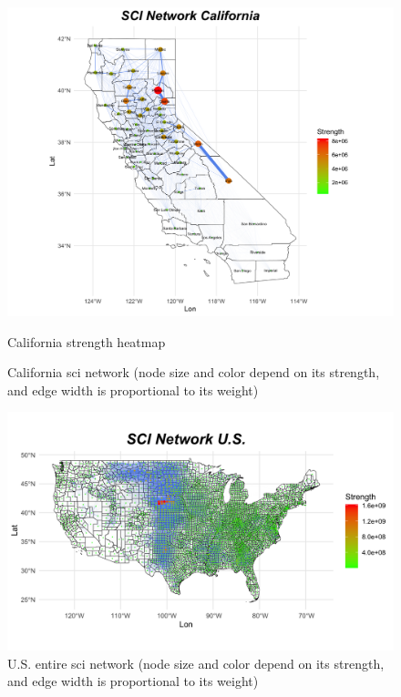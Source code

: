 \begin{figure}[h]
    \centering
    \begin{minipage}[c]{0.6\textwidth}
        \includegraphics[width= \textwidth]{images/task1/California/network_California_strength.png} 
        \caption{California strength heatmap} 
    \end{minipage}%
    \begin{minipage}[c]{0.4\textwidth}
        \caption{California sci network (node size and color depend on its strength, and edge width is proportional to its weight)}
        \label{California:strength}
    \end{minipage}
\end{figure}

\begin{figure}[h]
    \centering
    \begin{minipage}[c]{0.7\textwidth}
        \includegraphics[width=\textwidth]{images/task1/U.S./US_network.png}
    \end{minipage}%
    \begin{minipage}[c]{0.4\textwidth}
        \caption{U.S. entire sci network (node size and color depend on its strength, and edge width is proportional to its weight)}
        \label{fig:us_counties}
    \end{minipage}
\end{figure}

